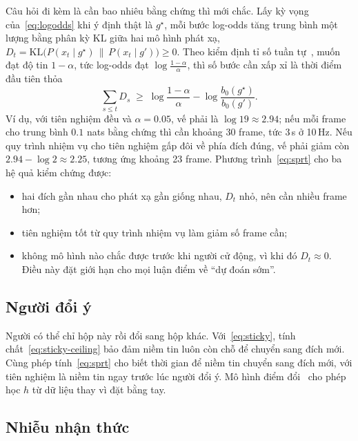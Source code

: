 Câu hỏi đi kèm là cần bao nhiêu bằng chứng thì mới chắc. Lấy kỳ vọng của~\eqref{eq:logodds} khi ý định thật là $g^\star$, mỗi bước log-odds tăng trung bình một lượng bằng phân kỳ KL giữa hai mô hình phát xạ, $D_t=\mathrm{KL}\big(P(x_t\mid g^\star)\,\|\,P(x_t\mid g')\big)\ge0$. Theo kiểm định tỉ số tuần tự~\cite{wald1945sequential}, muốn đạt độ tin $1-\alpha$, tức log-odds đạt $\log\frac{1-\alpha}{\alpha}$, thì số bước cần xấp xỉ là thời điểm đầu tiên thỏa
\begin{equation}
  \sum_{s\le t}D_s\;\ge\;\log\frac{1-\alpha}{\alpha}-\log\frac{b_0(g^\star)}{b_0(g')}.
  \label{eq:sprt}
\end{equation}
Ví dụ, với tiên nghiệm đều và $\alpha=0.05$, vế phải là $\log 19\approx2.94$; nếu mỗi frame cho trung bình $0.1$ nats bằng chứng thì cần khoảng 30 frame, tức 3\,s ở 10\,Hz. Nếu quy trình nhiệm vụ cho tiên nghiệm gấp đôi về phía đích đúng, vế phải giảm còn $2.94-\log2\approx2.25$, tương ứng khoảng 23 frame. Phương trình~\eqref{eq:sprt} cho ba hệ quả kiểm chứng được:
\begin{itemize}
  \item hai đích gần nhau cho phát xạ gần giống nhau, $D_t$ nhỏ, nên cần nhiều frame hơn;
  \item tiên nghiệm tốt từ quy trình nhiệm vụ làm giảm số frame cần;
  \item không mô hình nào chắc được trước khi người cử động, vì khi đó $D_t\approx0$. Điều này đặt giới hạn cho mọi luận điểm về ``dự đoán sớm''.
\end{itemize}

\subsection{Người đổi ý}

Người có thể chỉ hộp này rồi đổi sang hộp khác. Với~\eqref{eq:sticky}, tính chất~\eqref{eq:sticky-ceiling} bảo đảm niềm tin luôn còn chỗ để chuyển sang đích mới. Cùng phép tính~\eqref{eq:sprt} cho biết thời gian để niềm tin chuyển sang đích mới, với tiên nghiệm là niềm tin ngay trước lúc người đổi ý. Mô hình điểm đổi~\cite{fearnhead2007online} cho phép học $h$ từ dữ liệu thay vì đặt bằng tay.

\subsection{Nhiễu nhận thức}

